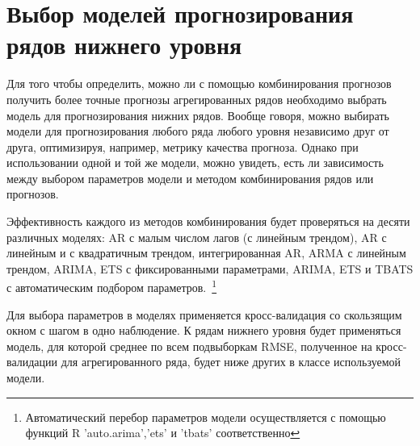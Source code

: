\documentclass[12pt,a4paper, oneside]{extreport}
\begin{document}

\section{Выбор моделей прогнозирования рядов нижнего уровня}

Для того чтобы определить, можно ли с помощью комбинирования прогнозов получить более точные прогнозы агрегированных рядов необходимо выбрать модель для прогнозирования нижних рядов. 
Вообще говоря, можно выбирать модели для прогнозирования любого ряда любого уровня независимо друг от друга, оптимизируя, например, метрику качества прогноза. Однако при использовании одной и той же модели, можно  увидеть, есть ли зависимость между выбором параметров модели и методом комбинирования рядов или прогнозов.

Эффективность каждого из методов комбинирования будет проверяться на десяти различных моделях: AR с малым числом лагов (с линейным трендом), AR с линейным и с квадратичным трендом, интегрированная AR, ARMA с линейным трендом, ARIMA, 
ETS с фиксированными параметрами,  ARIMA, ETS и TBATS с автоматическим подбором параметров.~\footnote{Автоматический перебор параметров модели осуществляется с помощью функций R  'auto.arima','ets' и 'tbats' соответственно }



Для выбора параметров в моделях применяется кросс-валидация  со скользящим окном с шагом в одно наблюдение. К рядам нижнего уровня будет применяться модель, для которой среднее по всем подвыборкам RMSE, полученное на кросс-валидации для   агрегированного ряда, будет ниже других в классе используемой модели.  
\end{document}
